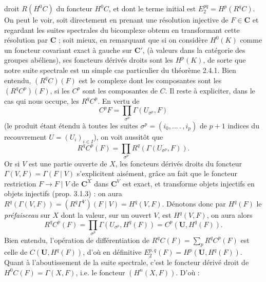 
\noindent droit $R(H^0C)$ du foncteur $H^0C$, et dont le terme initial est
$E_2^{pq}=H^p(R^qC)$.
On peut le voir, soit directement en prenant une résolution injective de
$F\in\mathbf C$ et regardant les suites spectrales du bicomplexe obtenu en
transformant cette résolution par $\mathbf C$ ; soit mieux, en remarquant que si on
considère $H^0(K)$ comme un foncteur covariant exact à gauche sur $\mathbf C'$, (à
valeurs dans la catégorie des groupes abéliens), ses foncteurs dérivés droits
sont les $H^p(K)$, de sorte que notre suite spectrale est un simple cas
particulier du théorème 2.4.1. Bien entendu, $(R^qC)(F)$ est le complexe dont
les composantes sont les $(R^qC^p)(F)$, si les $C^p$ sont les composantes de
$C$. Il reste à expliciter, dans le cas qui nous occupe, les $R^qC^p$. En
vertu de
\[
C^pF=\prod_{\sigma^p}\Gamma(U_{\sigma^p},F)
\]
(le produit étant étendu à toutes les suites
$\sigma^p=(i_0,\ldots\mathpunct{.},i_p)$ de $p+1$ indices du recouvrement
$U=(U_i)_{i\in I}$), on voit aussitôt que
\[
R^qC^p(F)=\prod_{\sigma^p}R^q(\Gamma(U_{\sigma^p},F)).
\]
Or si $V$ est une partie ouverte de $X$, les foncteurs dérivés droits du
foncteur $\Gamma(V,F)=\Gamma(F\mid V)$ s'explicitent aisément, grâce au fait
que le foncteur restriction $F\to F\mid V$ de $\mathbf C^X$ dans $\mathbf C^V$ est
exact, et transforme objets injectifs en objets injectifs (prop. 3.1.3) : on
aura
$R^q(\Gamma(V,F))=(R^q\Gamma^V)(F\mid V)=H^q(V,F)$.
Dénotons donc par $H^q(F)$ le \textit{préfaisceau} sur $X$ dont la valeur,
sur un ouvert $V$, est $H^q(V,F)$, on aura alors
\[
R^qC^p(F)=\prod_{\sigma^p}\Gamma(U_{\sigma^p},H^q(F))
=C^p(\mathbf U,H^q(F)).
\]
Bien entendu, l'opération de différentiation de
$R^qC(F)=\displaystyle\sum\limits_p R^qC^p(F)$ est celle de $C(\mathbf U,H^q(F))$, d'où en
définitive
$E_2^{p,q}(F)=H^p(\mathbf U,H^q(F))$.
Quant à l'aboutissement de la suite spectrale, c'est le foncteur dérivé droit
de $H^0C(F)=\Gamma(X,F)$, i.e. le foncteur $(H^n(X,F))$. D'où :

